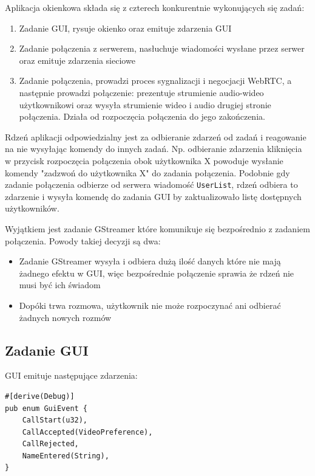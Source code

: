 Aplikacja okienkowa składa się z czterech konkurentnie wykonujących się zadań:

\begin{enumerate}
	\item Zadanie GUI, rysuje okienko oraz emituje zdarzenia GUI
	\item Zadanie połączenia z serwerem, nasłuchuje wiadomości wysłane przez serwer oraz emituje
	      zdarzenia sieciowe
	\item Zadanie połączenia, prowadzi proces sygnalizacji i negocjacji WebRTC, a następnie prowadzi
	      połączenie: prezentuje strumienie audio-wideo użytkownikowi oraz wysyła strumienie wideo i
	      audio drugiej stronie połączenia. Działa od rozpoczęcia połączenia do jego zakończenia.
\end{enumerate}

Rdzeń aplikacji odpowiedzialny jest za odbieranie zdarzeń od zadań i reagowanie na nie wysyłając
komendy do innych zadań. Np. odbieranie zdarzenia kliknięcia w przycisk rozpoczęcia połączenia
obok użytkownika X powoduje wysłanie komendy "zadzwoń do użytkownika X" do zadania połączenia.
Podobnie gdy zadanie połączenia odbierze od serwera wiadomość \verb|UserList|, rdzeń odbiera to
zdarzenie i wysyła komendę do zadania GUI by zaktualizowało listę dostępnych użytkowników.

Wyjątkiem jest zadanie GStreamer które komunikuje się bezpośrednio z zadaniem połączenia. Powody
takiej decyzji są dwa:

\begin{itemize}
	\item Zadanie GStreamer wysyła i odbiera dużą ilość danych które nie mają żadnego efektu w GUI,
	      więc bezpośrednie połączenie sprawia że rdzeń nie musi być ich świadom
	\item Dopóki trwa rozmowa, użytkownik nie może rozpoczynać ani odbierać żadnych nowych rozmów
\end{itemize}

\subsection{Zadanie GUI}

GUI emituje następujące zdarzenia:

\begin{verbatim}
#[derive(Debug)]
pub enum GuiEvent {
    CallStart(u32),
    CallAccepted(VideoPreference),
    CallRejected,
    NameEntered(String),
}
\end{verbatim}

